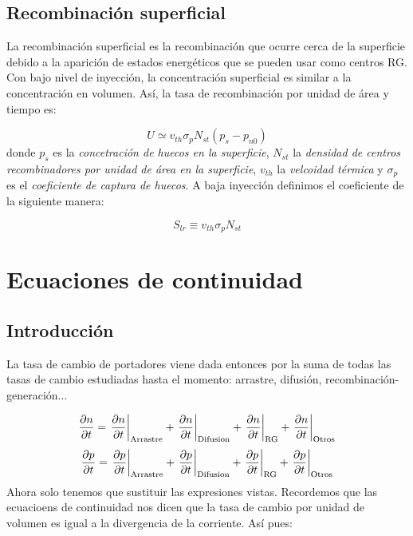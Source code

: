 \subsection{Recombinación superficial}

La recombinación superficial es la recombinación que ocurre cerca de la superficie debido a la aparición de estados energéticos que se pueden usar como centros RG. Con bajo nivel de inyección, la concentración superficial es similar a la concentración en volumen. Así, la tasa de recombinación por unidad de área y tiempo es:

\begin{equation}
	U  \simeq v_{th} \sigma_p N_{st} (p_s-p_{n0})
\end{equation}
donde $p_s$ es la \textit{concetración de huecos en la superficie}, $N_{st}$ la \textit{densidad de centros recombinadores por unidad de área en la superficie}, $v_{th}$ la \textit{velcoidad térmica} y $\sigma_p$ es el \textit{coeficiente de captura de huecos}. A baja inyección definimos el coeficiente de la siguiente manera:

\begin{equation}
	S_{lr} \equiv v_{th} \sigma_p N_{st}
\end{equation}



\section{Ecuaciones de continuidad}


\subsection{Introducción}

La tasa de cambio de portadores viene dada entonces por la suma de todas las tasas de cambio estudiadas hasta el momento: arrastre, difusión, recombinación-generación...

\begin{equation}
	\parciales{n}{t} = \eval{\parciales{n}{t}}_{\text{Arrastre}}+\eval{\parciales{n}{t}}_{\text{Difusion}}+\eval{\parciales{n}{t}}_{\text{RG}}+\eval{\parciales{n}{t}}_{\text{Otros}}
\end{equation}
\begin{equation}
	\parciales{p}{t} = \eval{\parciales{p}{t}}_{\text{Arrastre}}+\eval{\parciales{p}{t}}_{\text{Difusion}}+\eval{\parciales{p}{t}}_{\text{RG}}+\eval{\parciales{p}{t}}_{\text{Otros}}
\end{equation}
Ahora solo tenemos que sustituir las expresiones vistas. Recordemos que las ecuacioens de continuidad nos dicen que la tasa de cambio por unidad de volumen es igual a la divergencia de la corriente. Así pues: 

